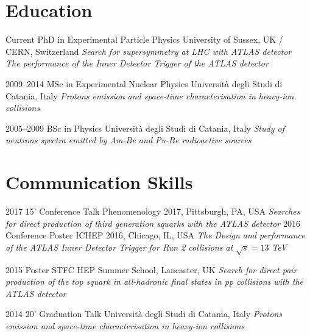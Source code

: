 \documentclass[]{cv} %
\begin{document}
\section{Education}

\begin{entrylist}

  \entry
      {Current}
      {PhD {\normalfont in Experimental Particle Physics}}
      {University of Sussex, UK / CERN, Switzerland}
      {\emph{Search for supersymmetry at LHC with ATLAS detector\\
      The performance of the Inner Detector Trigger of the ATLAS detector}
      }

  \entry
      {2009--2014}
      {MSc {\normalfont in Experimental Nuclear Physics}}
      {Università degli Studi di Catania, Italy}
      {\emph{Protons emission and space-time characterisation in heavy-ion collisions} }

  \entry
      {2005--2009}
      {BSc {\normalfont in Physics}}
      {Università degli Studi di Catania, Italy}
      {\emph{Study of neutrons spectra emitted by Am-Be and Pu-Be radioactive sources} }
\end{entrylist}

\section{Communication Skills}

\begin{entrylist}

  \entry
    {2017}
    {15' Conference Talk}
    {Phenomenology 2017, Pittsburgh, PA, USA}
    {\emph{Searches for direct production of third generation squarks with the ATLAS detector}}
  \entry
    {2016}
    {Conference Poster}
    {ICHEP 2016, Chicago, IL, USA}
    {\emph{The Design and performance of the ATLAS Inner Detector Trigger for Run 2 collisions at $\sqrt{s} = 13$ TeV}}

  \entry
    {2015}
    {Poster}
    {STFC HEP Summer School, Lancaster, UK}
    {\emph{Search for direct pair production of the top squark in all-hadronic final states in \emph{pp} collisions with the ATLAS detector}}

  \entry
    {2014}
    {20' Graduation Talk}
    {Università degli Studi di Catania, Italy}
    {\emph{Protons emission and space-time characterisation in heavy-ion collisions}}
\end{entrylist}
\end{document}
